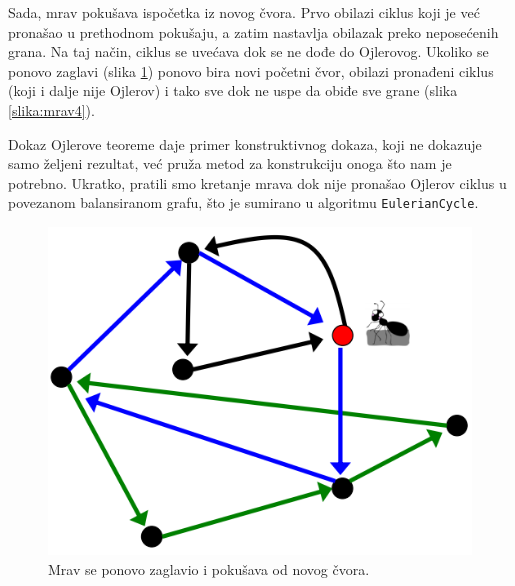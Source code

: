 Sada, mrav pokušava ispočetka iz novog čvora. Prvo obilazi ciklus koji je već pronašao u prethodnom pokušaju, a zatim nastavlja obilazak preko neposećenih grana. Na taj način, ciklus se uvećava dok se ne dođe do Ojlerovog. Ukoliko se ponovo zaglavi (slika \ref{slika:mrav3}) ponovo bira novi početni čvor, obilazi pronađeni ciklus (koji i dalje nije Ojlerov) i tako sve dok ne uspe da obiđe sve grane (slika \ref{slika:mrav4}).

Dokaz Ojlerove teoreme daje primer konstruktivnog dokaza, koji ne dokazuje samo željeni rezultat, već pruža metod za konstrukciju onoga što nam je potrebno. Ukratko, pratili smo kretanje mrava dok nije pronašao Ojlerov ciklus u povezanom balansiranom grafu, što je sumirano u algoritmu \texttt{EulerianCycle}.

\noindent
\begin{minipage}{\textwidth}
	\centering
	\begin{minipage}{0.45\textwidth}
		\begin{figure}[H]
			\centering
			\includegraphics[width=\textwidth]{poglavlja/3/slike/mrav3.png}
			\caption{Mrav se ponovo zaglavio i pokušava od novog čvora.}
			\label{slika:mrav3}
		\end{figure} 
	\end{minipage}
	\hfill 
	\begin{minipage}{0.45\textwidth}
		\begin{figure}[H]
			\centering

\end{figure}
\end{minipage}
\end{minipage}
